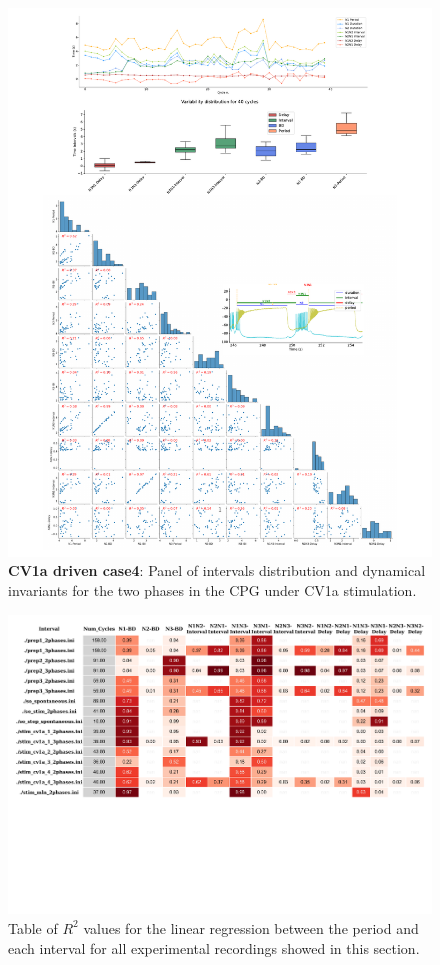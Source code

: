\begin{figure}[htbp]
	\centering
	\includegraphics[width=1.1\textwidth]{./invariants/data/SUSSEX/CV1a_driven4/images/2phases/panel_with_pairplot.pdf}
	\caption{\textbf{CV1a driven case4}: Panel of intervals distribution and dynamical invariants for the two phases in the CPG under CV1a stimulation.}
	\label{fig:cv1a 4 2phases pairplot}
\end{figure}


\begin{figure}
	\includegraphics[width=\textwidth]{./invariants/styled_table_invariants.pdf}
	\caption{Table of $R^2$ values for the linear regression between the period and each interval for all experimental recordings showed in this section.}
	\label{fig:R2 table}
\end{figure}




